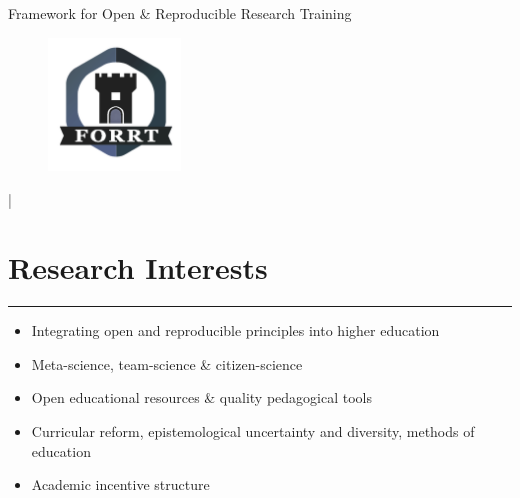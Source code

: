 \documentclass[letterpaper]{article}
\def\name{Framework for Open \& Reproducible Research Training}
\newcommand{\MYhref}[3][Gray]{\href{#2}{\color{#1}{#3}}}%
\begin{document}
\centerline{\selectfont\huge \name}


\begin{figure}
    \centering
    \includegraphics[width=100pt]{FORRT.png}
\end{figure}


\begin{center}
    \large \color{Gray}
\vspace{-0.5em}
\item
\hspace{-1.5em} \MYhref{mailto:info@forrt.org}{info@forrt.org} | \MYhref{https://forrt.org/}{forrt.org}
\end{center}









\section*{\color{Brown}Research Interests}
\vspace{-.5em}
\hrule
\vspace{1em}

\begin{itemize}
\item Integrating open and reproducible principles into higher education
\item Meta-science, team-science \& citizen-science
\item Open educational resources \& quality pedagogical tools
\item Curricular reform, epistemological uncertainty and diversity, methods of education
\item Academic incentive structure 
\end{itemize}




\\~\\
\end{document}

